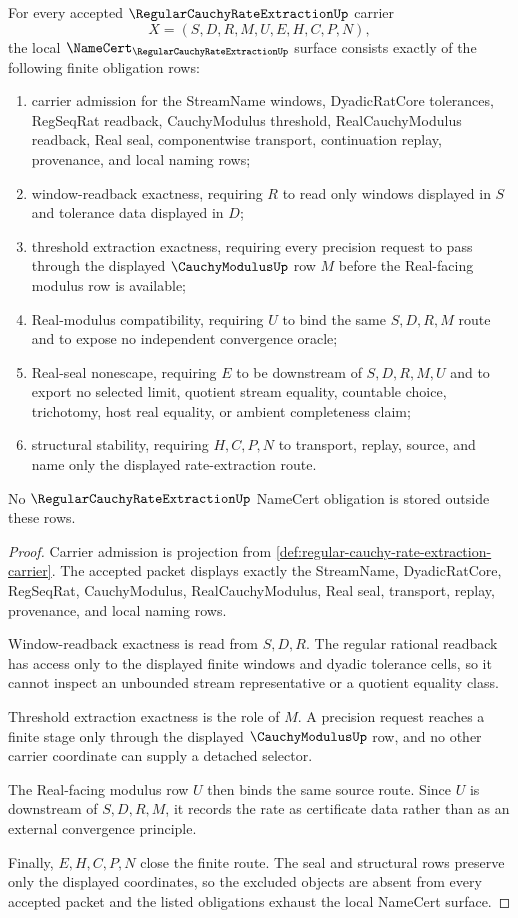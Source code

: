 \begin{theorem}
\label{thm:regular-cauchy-rate-extraction-namecert-obligations}
For every accepted $\RegularCauchyRateExtractionUp$ carrier
$$
X=(S,D,R,M,U,E,H,C,P,N),
$$
the local $\NameCert_{\RegularCauchyRateExtractionUp}$ surface consists exactly of the following finite obligation rows:
\begin{enumerate}
\item carrier admission for the StreamName windows, DyadicRatCore tolerances, RegSeqRat readback, CauchyModulus threshold, RealCauchyModulus readback, Real seal, componentwise transport, continuation replay, provenance, and local naming rows;
\item window-readback exactness, requiring $R$ to read only windows displayed in $S$ and tolerance data displayed in $D$;
\item threshold extraction exactness, requiring every precision request to pass through the displayed $\CauchyModulusUp$ row $M$ before the Real-facing modulus row is available;
\item Real-modulus compatibility, requiring $U$ to bind the same $S,D,R,M$ route and to expose no independent convergence oracle;
\item Real-seal nonescape, requiring $E$ to be downstream of $S,D,R,M,U$ and to export no selected limit, quotient stream equality, countable choice, trichotomy, host real equality, or ambient completeness claim;
\item structural stability, requiring $H,C,P,N$ to transport, replay, source, and name only the displayed rate-extraction route.
\end{enumerate}
No $\RegularCauchyRateExtractionUp$ NameCert obligation is stored outside these rows.
\end{theorem}
\begin{proof}
Carrier admission is projection from \autoref{def:regular-cauchy-rate-extraction-carrier}. The accepted packet displays exactly the StreamName, DyadicRatCore, RegSeqRat, CauchyModulus, RealCauchyModulus, Real seal, transport, replay, provenance, and local naming rows.

Window-readback exactness is read from $S,D,R$. The regular rational readback has access only to the displayed finite windows and dyadic tolerance cells, so it cannot inspect an unbounded stream representative or a quotient equality class.

Threshold extraction exactness is the role of $M$. A precision request reaches a finite stage only through the displayed $\CauchyModulusUp$ row, and no other carrier coordinate can supply a detached selector.

The Real-facing modulus row $U$ then binds the same source route. Since $U$ is downstream of $S,D,R,M$, it records the rate as certificate data rather than as an external convergence principle.

Finally, $E,H,C,P,N$ close the finite route. The seal and structural rows preserve only the displayed coordinates, so the excluded objects are absent from every accepted packet and the listed obligations exhaust the local NameCert surface.
\end{proof}

